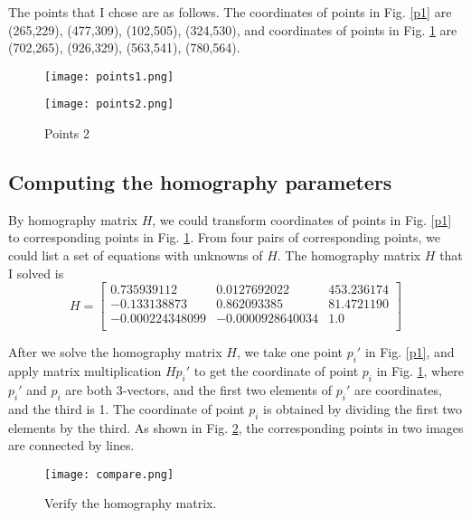\documentclass[UTF8,a4paper,10pt]{ctexart}
\begin{document}
The points that I chose are as follows. The coordinates of points in Fig. \ref{p1} are (265,229), (477,309), (102,505), (324,530), and coordinates of points in Fig. \ref{p2} are (702,265), (926,329), (563,541), (780,564).
\begin{figure}[H]
	\centering
	\begin{minipage}[t]{0,45\textwidth}	
		\centering
		\texttt{[image: points1.png]} %
		\caption{Points 1} %
		\label{p1} %
	\end{minipage}
	\hfil
	\begin{minipage}[t]{0,45\textwidth}	
		\centering
		\texttt{[image: points2.png]} %
		\caption{Points 2} %
		\label{p2} %
	\end{minipage}
\end{figure}

\subsection{Computing the homography parameters}

By homography matrix $H$, we could transform coordinates of points in Fig. \ref{p1} to corresponding points in Fig. \ref{p2}. 
From four pairs of corresponding points, we could list a set of equations with unknowns of $H$.
The homography matrix $H$ that I solved is
$$
H = \begin{bmatrix}
0.735939112 & 0.0127692022 & 453.236174\\ 
-0.133138873 & 0.862093385 & 81.4721190 \\ 
-0.000224348099 & -0.0000928640034 & 1.0 \\ 
\end{bmatrix}
$$

After we solve the homography matrix $H$, we take one point $p_{i}\prime $ in Fig. \ref{p1}, and apply matrix multiplication $Hp_{i}\prime$ to get the coordinate of point $p_{i}$ in Fig. \ref{p2}, where $p_{i}\prime$ and $p_{i}$ are both 3-vectors, and the first two elements of $p_{i}\prime$ are coordinates, and the third is 1. The coordinate of point $p_{i}$ is obtained by dividing the first two elements by the third.
As shown in Fig. \ref{compare}, the corresponding points in two images are connected by lines.
\begin{figure}[htbp]
\centerline{\texttt{[image: compare.png]}}
\caption{Verify the homography matrix.}
\label{compare}
\end{figure}
\end{document}
